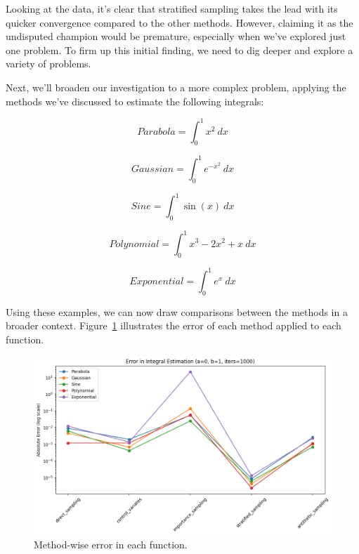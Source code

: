 \documentclass{article}
\begin{document}
Looking at the data, it’s clear that stratified sampling takes the lead with its quicker convergence compared to the other methods. However, claiming it as the undisputed champion would be premature, especially when we’ve explored just one problem. To firm up this initial finding, we need to dig deeper and explore a variety of problems.

Next, we'll broaden our investigation to a more complex problem, applying the methods we’ve discussed to estimate the following integrals:

\begin{equation} 
	\label{eq:integralvariancereduction1} 
	Parabola = \int_{0}^{1} x^2 \ dx 
\end{equation}

\begin{equation} 
	\label{eq:integralvariancereduction2} 
	Gaussian = \int_{0}^{1} e^{-x^2} \ dx
\end{equation}

\begin{equation} 
	\label{eq:integralvariancereduction3} 
	Sine = \int_{0}^{1} \sin(x) \ dx
\end{equation}

\begin{equation} 
	\label{eq:integralvariancereduction4} 
	Polynomial = \int_{0}^{1} x^3 - 2x^2 + x \ dx
\end{equation}

\begin{equation} 
	\label{eq:integralvariancereduction5} 
	Exponential = \int_{0}^{1} e^x \ dx
\end{equation}

Using these examples, we can now draw comparisons between the methods in a broader context. Figure~\ref{fig:comparisonvariancereduction2} illustrates the error of each method applied to each function.

\begin{figure}[H]
\centering
\includegraphics[width=0.5\linewidth]{./Figures/VarianceReduction/comparisonintegrals.png}
\caption{Method-wise error in each function.}
\label{fig:comparisonvariancereduction2}
\end{figure}
\end{document}
